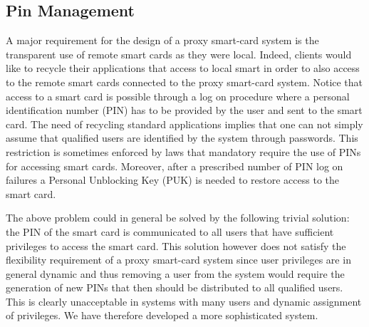 \documentclass[preprint,authoryear,12pt]{elsarticle}
\begin{document}
\subsection{Pin Management}
A major requirement for the design of a proxy smart-card system is the transparent use of remote smart cards as they were local. Indeed, clients would like to recycle their applications that access to local smart in order to also access to the remote smart cards connected to the proxy smart-card system. Notice that access to a smart card is possible through a log on procedure where a personal identification number (PIN) has to be provided by the user and sent to the smart card. The need of recycling standard applications implies that one can not simply assume that qualified users are identified by the system through passwords. This restriction is sometimes enforced  by laws that mandatory require the use of PINs for accessing smart cards. Moreover, after a prescribed number of PIN log on failures a Personal Unblocking Key (PUK) is needed to restore access to the smart card.

The above problem could in general be solved by the following trivial solution: the PIN of the smart card is communicated to all users that have sufficient privileges to access the smart card. This solution however does not satisfy the flexibility requirement of a proxy smart-card system since user privileges are in general dynamic and thus removing a user from the system would require the generation of new PINs that then should be distributed to all qualified users. This is clearly unacceptable in systems with many users and dynamic assignment of privileges. We have therefore developed a more sophisticated system.
\end{document}

